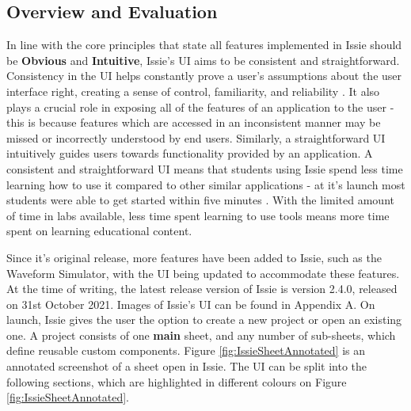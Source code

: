 \subsection{Overview and Evaluation}
In line with the core principles that state all features implemented in Issie should be \textbf{Obvious} and \textbf{Intuitive}, Issie's UI aims to be consistent and straightforward. Consistency in the UI helps constantly prove a user’s assumptions about the user interface right, creating a sense of control, familiarity, and reliability \cite{uiconsistency}. It also plays a crucial role in exposing all of the features of an application to the user - this is because features which are accessed in an inconsistent manner may be missed or incorrectly understood by end users. Similarly, a straightforward UI intuitively guides users towards functionality provided by an application. A consistent and straightforward UI means that students using Issie spend less time learning how to use it compared to other similar applications - at it's launch most students were able to get started within five minutes \cite{marco_diss}. With the limited amount of time in labs available, less time spent learning to use tools means more time spent on learning educational content.

Since it's original release, more features have been added to Issie, such as the Waveform Simulator, with the UI being updated to accommodate these features. At the time of writing, the latest release version of Issie is version 2.4.0, released on 31st October 2021. Images of Issie's UI can be found in Appendix A. On launch, Issie gives the user the option to create a new project or open an existing one. A project consists of one \textbf{main} sheet, and any number of sub-sheets, which define reusable custom components. Figure \ref{fig:IssieSheetAnnotated} is an annotated screenshot of a sheet open in Issie. The UI can be split into the following sections, which are highlighted in different colours on Figure \ref{fig:IssieSheetAnnotated}.

